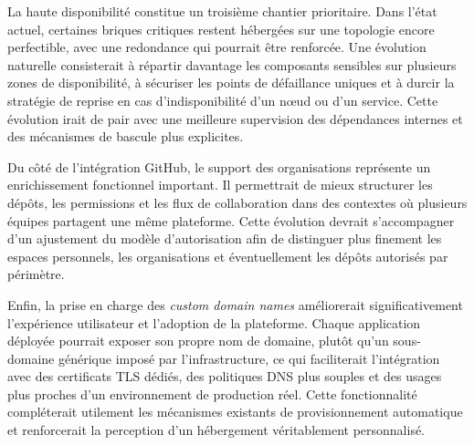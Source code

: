 La haute disponibilité constitue un troisième chantier prioritaire. Dans l'état actuel, certaines briques critiques restent hébergées sur une topologie encore perfectible, avec une redondance qui pourrait être renforcée. Une évolution naturelle consisterait à répartir davantage les composants sensibles sur plusieurs zones de disponibilité, à sécuriser les points de défaillance uniques et à durcir la stratégie de reprise en cas d'indisponibilité d'un nœud ou d'un service. Cette évolution irait de pair avec une meilleure supervision des dépendances internes et des mécanismes de bascule plus explicites.

Du côté de l'intégration GitHub, le support des organisations représente un enrichissement fonctionnel important. Il permettrait de mieux structurer les dépôts, les permissions et les flux de collaboration dans des contextes où plusieurs équipes partagent une même plateforme. Cette évolution devrait s'accompagner d'un ajustement du modèle d'autorisation afin de distinguer plus finement les espaces personnels, les organisations et éventuellement les dépôts autorisés par périmètre.

Enfin, la prise en charge des 	\textit{custom domain names} améliorerait significativement l'expérience utilisateur et l'adoption de la plateforme. Chaque application déployée pourrait exposer son propre nom de domaine, plutôt qu'un sous-domaine générique imposé par l'infrastructure, ce qui faciliterait l'intégration avec des certificats TLS dédiés, des politiques DNS plus souples et des usages plus proches d'un environnement de production réel. Cette fonctionnalité compléterait utilement les mécanismes existants de provisionnement automatique et renforcerait la perception d'un hébergement véritablement personnalisé.
